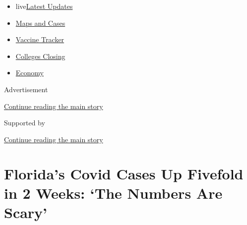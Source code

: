 \begin{itemize}
\tightlist
\item
  live\href{https://www.nytimes3xbfgragh.onion/2020/08/20/world/coronavirus-covid.html?name=styln-coronavirus-national\&region=TOP_BANNER\&variant=undefined\&block=storyline_menu_recirc\&action=click\&pgtype=Article\&impression_id=3e6ba920-e385-11ea-85cc-bf105b368d22}{Latest
  Updates}
\item
  \href{https://www.nytimes3xbfgragh.onion/interactive/2020/us/coronavirus-us-cases.html?name=styln-coronavirus-national\&region=TOP_BANNER\&variant=undefined\&block=storyline_menu_recirc\&action=click\&pgtype=Article\&impression_id=3e6ba921-e385-11ea-85cc-bf105b368d22}{Maps
  and Cases}
\item
  \href{https://www.nytimes3xbfgragh.onion/interactive/2020/science/coronavirus-vaccine-tracker.html?name=styln-coronavirus-national\&region=TOP_BANNER\&variant=undefined\&block=storyline_menu_recirc\&action=click\&pgtype=Article\&impression_id=3e6ba922-e385-11ea-85cc-bf105b368d22}{Vaccine
  Tracker}
\item
  \href{https://www.nytimes3xbfgragh.onion/2020/08/19/us/colleges-closing-covid.html?name=styln-coronavirus-national\&region=TOP_BANNER\&variant=undefined\&block=storyline_menu_recirc\&action=click\&pgtype=Article\&impression_id=3e6ba923-e385-11ea-85cc-bf105b368d22}{Colleges
  Closing}
\item
  \href{https://www.nytimes3xbfgragh.onion/live/2020/08/20/business/stock-market-today-coronavirus?name=styln-coronavirus-national\&region=TOP_BANNER\&variant=undefined\&block=storyline_menu_recirc\&action=click\&pgtype=Article\&impression_id=3e6ba924-e385-11ea-85cc-bf105b368d22}{Economy}
\end{itemize}

Advertisement

\protect\hyperlink{after-top}{Continue reading the main story}

Supported by

\protect\hyperlink{after-sponsor}{Continue reading the main story}

\hypertarget{floridas-covid-cases-up-fivefold-in-2-weeks-the-numbers-are-scary}{%
\section{Florida's Covid Cases Up Fivefold in 2 Weeks: `The Numbers Are
Scary'}\label{floridas-covid-cases-up-fivefold-in-2-weeks-the-numbers-are-scary}}

